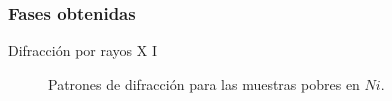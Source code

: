 \documentclass[11pt]{beamer}
\begin{document}
		\subsubsection{Fases obtenidas}
			\begin{frame}{Difracción por rayos X I}
				\begin{figure}[H]
					\captionsetup[subfloat]{labelformat=empty}
					 \qquad
					\caption*{Patrones de difracción para las muestras pobres en $Ni$.}
					\label{RXNiPoor}
				\end{figure}		
			\end{frame}
			
\end{document}
